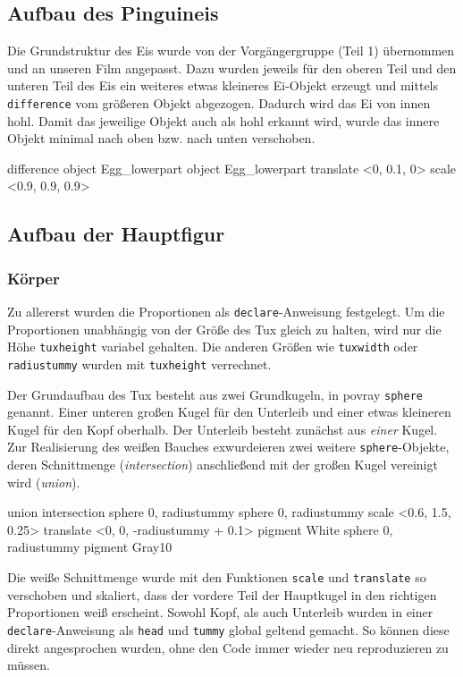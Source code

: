 \documentclass[11pt,parskip]{scrartcl}
\begin{document}
\subsection{Aufbau des Pinguineis}
Die Grundstruktur des Eis wurde von der Vorgängergruppe (Teil 1) übernommen
und an unseren Film angepasst. Dazu wurden jeweils für den oberen Teil und den
unteren Teil des Eis ein weiteres etwas kleineres Ei-Objekt erzeugt und mittels
\texttt{difference} vom größeren Objekt abgezogen. Dadurch wird das Ei von
innen hohl. Damit das jeweilige Objekt auch als hohl erkannt wird, wurde das
innere Objekt minimal nach oben bzw. nach unten verschoben.
%
\begin{tcblisting}{}
    difference{
    object{ Egg_lowerpart }
    object{
      Egg_lowerpart
      translate <0, 0.1, 0>
      scale <0.9, 0.9, 0.9>
    }
  }
\end{tcblisting}


\subsection{Aufbau der Hauptfigur}

\subsubsection{Körper}
Zu allererst wurden die Proportionen als \texttt{declare}-Anweisung festgelegt.
Um die Proportionen unabhängig von der Größe des Tux gleich zu halten, wird
nur die Höhe \texttt{tuxheight} variabel gehalten. Die anderen Größen wie
\texttt{tuxwidth} oder \texttt{radiustummy} wurden mit \texttt{tuxheight}
verrechnet.

Der Grundaufbau des Tux besteht aus zwei Grundkugeln, in povray \texttt{sphere}
genannt. Einer unteren großen Kugel für den Unterleib und einer etwas kleineren
Kugel für den Kopf oberhalb. Der Unterleib besteht zunächst aus \emph{einer}
Kugel. Zur Realisierung des weißen Bauches exwurdeieren zwei weitere
\texttt{sphere}-Objekte, deren Schnittmenge (\emph{intersection}) anschließend
mit der großen Kugel vereinigt wird (\emph{union}).
%
\begin{tcblisting}{}
  union{
    intersection{
      sphere{ 0, radiustummy }
      sphere{ 0, radiustummy }
      scale <0.6, 1.5, 0.25>
      translate <0, 0, -radiustummy + 0.1>
    }
    pigment{ White }
    sphere{
      0, radiustummy
      pigment{ Gray10 }
    }
  }
\end{tcblisting}
%
Die weiße Schnittmenge wurde mit den Funktionen \texttt{scale} und
\texttt{translate} so verschoben und skaliert, dass der vordere Teil der
Hauptkugel in den richtigen Proportionen weiß erscheint. Sowohl Kopf, als auch
Unterleib wurden in einer \texttt{declare}-Anweisung als \texttt{head} und
\texttt{tummy} global geltend gemacht. So können diese direkt angesprochen
wurden, ohne den Code immer wieder neu reproduzieren zu müssen.
\end{document}
